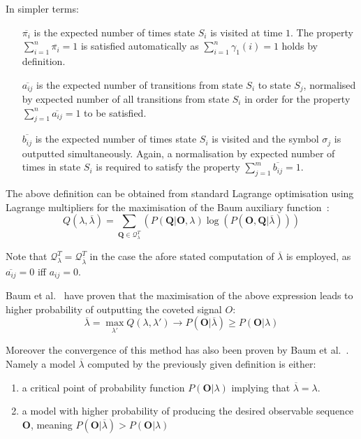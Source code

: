 \begin{samepage}

In simpler terms:
\begin{itemize}
\item[$\overline{\pi_i}$] is the expected number of times state $S_i$ is visited at time $1$. The property $\sum_{i=1}^n\overline{\pi_i}=1$ is satisfied automatically as $\sum_{i=1}^n\gamma_1(i)=1$ holds by definition.
\item[$\overline{a_{ij}}$] is the expected number of transitions from state $S_i$ to state $S_j$, normalised by expected number of all transitions from state $S_i$ in order for the property $\sum_{j=1}^n\overline{a_{ij}}=1$ to be satisfied.
\item[$\overline{b_{ij}}$] is the expected number of times state $S_i$ is visited and the symbol $\sigma_j$ is outputted simultaneously. Again, a normalisation by expected number of times in state $S_i$ is required to satisfy the property $\sum_{j=1}^m\overline{b_{ij}}=1$.
\end{itemize}
\end{samepage}

The above definition can be obtained from standard Lagrange optimisation using Lagrange multipliers for the maximisation of the Baum auxiliary function~\cite{Rabiner89hmm}:
$$Q(\lambda,\overline{\lambda})=\sum_{\mathbf{Q}\in\mathcal{Q}^T_\lambda}(P(\mathbf{Q}|\mathbf{O},\lambda)\log(P(\mathbf{O},\mathbf{Q}|\overline{\lambda})))$$

Note that $\mathcal{Q}^T_\lambda = \mathcal{Q}^T_{\overline{\lambda}}$ in the case the afore stated computation of $\overline{\lambda}$ is employed, as $\overline{a_{ij}}=0$ iff $a_{ij}=0$.

Baum et al.~\cite{baum1968, baum1970, baker1975} have proven that the maximisation of the above expression leads to higher probability of outputting the coveted signal $O$:
$$\overline{\lambda}=\max_{\lambda'}{Q(\lambda,\lambda')} \rightarrow P(\mathbf{O}|\overline{\lambda}) \geq P(\mathbf{O}|\lambda)$$

Moreover the convergence of this method has also been proven by Baum et al.~\cite{baum1968, baker1975}. Namely a model $\overline{\lambda}$ computed by the previously given definition is either:
\begin{enumerate}
\item a critical point of probability function $P(\mathbf{O}|\lambda)$ implying that $\overline{\lambda}=\lambda$.
\item a model with higher probability of producing the desired observable sequence $\mathbf{O}$, meaning $P(\mathbf{O}|\overline{\lambda}) > P(\mathbf{O}|\lambda)$
\end{enumerate}

